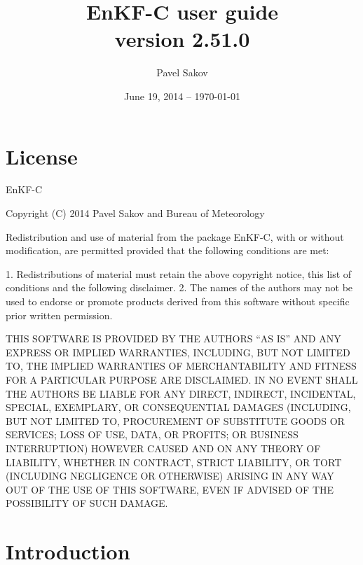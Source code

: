 \documentclass[11pt]{report}
\begin{document}
\title{EnKF-C user guide\\{\normalsize version 2.51.0}}

\author{Pavel Sakov}
\date{June 19, 2014 -- \today}

\maketitle
\thispagestyle{empty}

\clearpage

\tableofcontents

\clearpage

\chapter*{License}

EnKF-C

Copyright (C) 2014 Pavel Sakov and Bureau of Meteorology

Redistribution and use of material from the package EnKF-C, with or without
modification, are permitted provided that the following conditions are 
met:

   1. Redistributions of material must retain the above copyright notice, this
      list of conditions and the following disclaimer.
   2. The names of the authors may not be used to endorse or promote products
      derived from this software without specific prior written permission.

THIS SOFTWARE IS PROVIDED BY THE AUTHORS ``AS IS'' AND ANY EXPRESS OR IMPLIED 
WARRANTIES, INCLUDING, BUT NOT LIMITED TO, THE IMPLIED WARRANTIES OF
MERCHANTABILITY AND FITNESS FOR A PARTICULAR PURPOSE ARE DISCLAIMED. IN NO
EVENT SHALL THE AUTHORS BE LIABLE FOR ANY DIRECT, INDIRECT, INCIDENTAL, SPECIAL,
EXEMPLARY, OR CONSEQUENTIAL DAMAGES (INCLUDING, BUT NOT LIMITED TO, PROCUREMENT
OF SUBSTITUTE GOODS OR SERVICES; LOSS OF USE, DATA, OR PROFITS; OR BUSINESS
INTERRUPTION) HOWEVER CAUSED AND ON ANY THEORY OF LIABILITY, WHETHER IN
CONTRACT, STRICT LIABILITY, OR TORT (INCLUDING NEGLIGENCE OR OTHERWISE) ARISING
IN ANY WAY OUT OF THE USE OF THIS SOFTWARE, EVEN IF ADVISED OF THE POSSIBILITY
OF SUCH DAMAGE.

\chapter*{Introduction}
\end{document}
